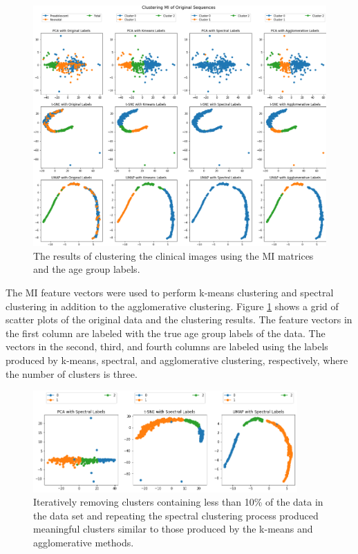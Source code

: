 \begin{figure}[t!]
\centering
\includegraphics[width=1.0\textwidth]{6/figures/bold-mi-agegroup.png}
\caption{The results of clustering the clinical images using the MI matrices and the age group labels.}
\label{fig:mocha-ages-mi-bold}
\end{figure}

The MI feature vectors were used to perform k-means clustering and spectral clustering in addition to the agglomerative clustering. Figure \ref{fig:mocha-ages-mi-bold} shows a grid of scatter plots of the original data and the clustering results. The feature vectors in the first column are labeled with the true age group labels of the data. The vectors in the second, third, and fourth columns are labeled using the labels produced by k-means, spectral, and agglomerative clustering, respectively, where the number of clusters is three. 

\begin{figure}[t!]
\centering
\includegraphics[width=0.9\textwidth]{6/figures/spectral-revised.png}
\caption{Iteratively removing clusters containing less than 10\% of the data in the data set and repeating the spectral clustering process produced meaningful clusters similar to those produced by the k-means and agglomerative methods.}
\label{fig:spectral-revised}
\end{figure}

